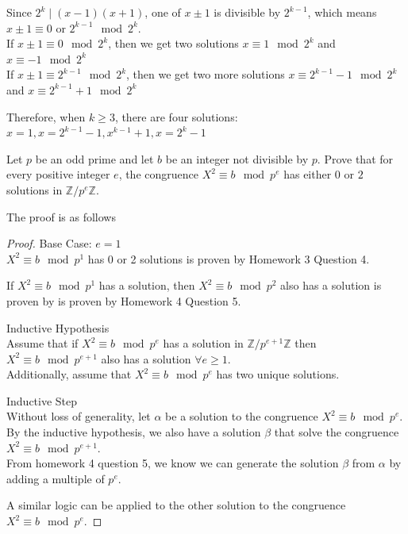 \documentclass[12pt]{article}
\begin{document}
\noindent
Since $2^k\mid(x-1)(x+1)$, one of $x\pm1$ is divisible by $2^{k-1}$, which means $x\pm1\equiv0$ or $2^{k-1}\mod{2^k}$.\\
If $x\pm1\equiv0\mod{2^k}$, then we get two solutions $x\equiv1\mod{2^k}$ and $x\equiv-1\mod{2^k}$\\
If $x\pm1\equiv2^{k-1}\mod{2^k}$, then we get two more solutions $x\equiv2^{k-1}-1\mod{2^k}$ and $x\equiv2^{k-1}+1\mod{2^k}$

\noindent
Therefore, when $k\geq3$, there are four solutions: $x=1,x=2^{k-1}-1,x^{k-1}+1,x=2^k-1$

\newpage
\problem Let $p$ be an odd prime and let $b$ be an integer not divisible by $p$. Prove that for every positive integer $e$, the congruence $X^2\equiv b\mod{p^e}$ has either $0$ or $2$ solutions in $\mathbb{Z}/p^e\mathbb{Z}$.

\solution
The proof is as follows
\begin{proof}
    Base Case: $e=1$\\
    $X^2\equiv b\mod{p^1}$ has 0 or 2 solutions is proven by Homework 3 Question 4.

    \noindent
    If $X^2\equiv b\mod{p^1}$ has a solution, then $X^2\equiv b\mod{p^2}$ also has a solution is proven by is proven by Homework 4 Question 5.

    \noindent
    Inductive Hypothesis\\
    Assume that if $X^2\equiv b\mod{p^{e}}$ has a solution in $\mathbb{Z}/p^{e+1}\mathbb{Z}$ then $X^2\equiv b\mod{p^{e+1}}$ also has a solution $\forall e\geq 1$.\\
    Additionally, assume that $X^2\equiv b\mod{p^{e}}$ has two unique solutions.

    \noindent
    Inductive Step\\
    Without loss of generality, let $\alpha$ be a solution to the congruence $X^2\equiv b\mod{p^e}$.\\
    By the inductive hypothesis, we also have a solution $\beta$ that solve the congruence $X^2\equiv b\mod{p^{e+1}}$.\\
    From homework 4 question 5, we know we can generate the solution $\beta$ from $\alpha$ by adding a multiple of $p^e$.

    \noindent
    A similar logic can be applied to the other solution to the congruence $X^2\equiv b\mod{p^e}$.
\end{proof}
\end{document}
